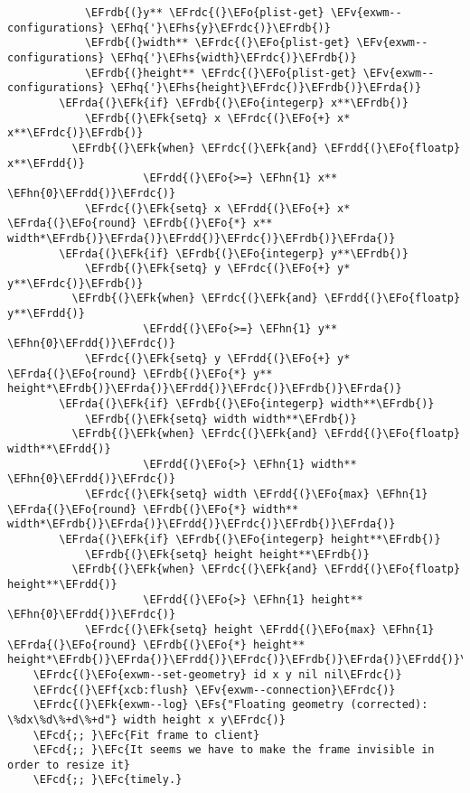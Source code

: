 \documentclass[a4wide,10pt]{article}
\newcommand{\EFc}[1]{\textcolor{EFc}{#1}} %
\newcommand{\EFcd}[1]{\textcolor{EFcd}{#1}} %
\newcommand{\EFs}[1]{\textcolor{EFs}{#1}} %
\newcommand{\EFk}[1]{\textcolor{EFk}{#1}} %
\newcommand{\EFf}[1]{\textcolor{EFf}{#1}} %
\newcommand{\EFv}[1]{\textcolor{EFv}{#1}} %
\newcommand{\EFo}[1]{\textcolor{EFo}{#1}} %
\newcommand{\EFhn}[1]{\textcolor{EFhn}{\textbf{#1}}} %
\newcommand{\EFhq}[1]{\textcolor{EFhq}{#1}} %
\newcommand{\EFhs}[1]{\textcolor{EFhs}{#1}} %
\newcommand{\EFrda}[1]{\textcolor{EFrda}{#1}} %
\newcommand{\EFrdb}[1]{\textcolor{EFrdb}{#1}} %
\newcommand{\EFrdc}[1]{\textcolor{EFrdc}{#1}} %
\newcommand{\EFrdd}[1]{\textcolor{EFrdd}{#1}} %
\begin{document}
\begin{Code}
\begin{Verbatim}
            \EFrdb{(}y** \EFrdc{(}\EFo{plist-get} \EFv{exwm--configurations} \EFhq{'}\EFhs{y}\EFrdc{)}\EFrdb{)}
            \EFrdb{(}width** \EFrdc{(}\EFo{plist-get} \EFv{exwm--configurations} \EFhq{'}\EFhs{width}\EFrdc{)}\EFrdb{)}
            \EFrdb{(}height** \EFrdc{(}\EFo{plist-get} \EFv{exwm--configurations} \EFhq{'}\EFhs{height}\EFrdc{)}\EFrdb{)}\EFrda{)}
        \EFrda{(}\EFk{if} \EFrdb{(}\EFo{integerp} x**\EFrdb{)}
            \EFrdb{(}\EFk{setq} x \EFrdc{(}\EFo{+} x* x**\EFrdc{)}\EFrdb{)}
          \EFrdb{(}\EFk{when} \EFrdc{(}\EFk{and} \EFrdd{(}\EFo{floatp} x**\EFrdd{)}
                     \EFrdd{(}\EFo{>=} \EFhn{1} x** \EFhn{0}\EFrdd{)}\EFrdc{)}
            \EFrdc{(}\EFk{setq} x \EFrdd{(}\EFo{+} x* \EFrda{(}\EFo{round} \EFrdb{(}\EFo{*} x** width*\EFrdb{)}\EFrda{)}\EFrdd{)}\EFrdc{)}\EFrdb{)}\EFrda{)}
        \EFrda{(}\EFk{if} \EFrdb{(}\EFo{integerp} y**\EFrdb{)}
            \EFrdb{(}\EFk{setq} y \EFrdc{(}\EFo{+} y* y**\EFrdc{)}\EFrdb{)}
          \EFrdb{(}\EFk{when} \EFrdc{(}\EFk{and} \EFrdd{(}\EFo{floatp} y**\EFrdd{)}
                     \EFrdd{(}\EFo{>=} \EFhn{1} y** \EFhn{0}\EFrdd{)}\EFrdc{)}
            \EFrdc{(}\EFk{setq} y \EFrdd{(}\EFo{+} y* \EFrda{(}\EFo{round} \EFrdb{(}\EFo{*} y** height*\EFrdb{)}\EFrda{)}\EFrdd{)}\EFrdc{)}\EFrdb{)}\EFrda{)}
        \EFrda{(}\EFk{if} \EFrdb{(}\EFo{integerp} width**\EFrdb{)}
            \EFrdb{(}\EFk{setq} width width**\EFrdb{)}
          \EFrdb{(}\EFk{when} \EFrdc{(}\EFk{and} \EFrdd{(}\EFo{floatp} width**\EFrdd{)}
                     \EFrdd{(}\EFo{>} \EFhn{1} width** \EFhn{0}\EFrdd{)}\EFrdc{)}
            \EFrdc{(}\EFk{setq} width \EFrdd{(}\EFo{max} \EFhn{1} \EFrda{(}\EFo{round} \EFrdb{(}\EFo{*} width** width*\EFrdb{)}\EFrda{)}\EFrdd{)}\EFrdc{)}\EFrdb{)}\EFrda{)}
        \EFrda{(}\EFk{if} \EFrdb{(}\EFo{integerp} height**\EFrdb{)}
            \EFrdb{(}\EFk{setq} height height**\EFrdb{)}
          \EFrdb{(}\EFk{when} \EFrdc{(}\EFk{and} \EFrdd{(}\EFo{floatp} height**\EFrdd{)}
                     \EFrdd{(}\EFo{>} \EFhn{1} height** \EFhn{0}\EFrdd{)}\EFrdc{)}
            \EFrdc{(}\EFk{setq} height \EFrdd{(}\EFo{max} \EFhn{1} \EFrda{(}\EFo{round} \EFrdb{(}\EFo{*} height** height*\EFrdb{)}\EFrda{)}\EFrdd{)}\EFrdc{)}\EFrdb{)}\EFrda{)}\EFrdd{)}\EFrdc{)}
    \EFrdc{(}\EFo{exwm--set-geometry} id x y nil nil\EFrdc{)}
    \EFrdc{(}\EFf{xcb:flush} \EFv{exwm--connection}\EFrdc{)}
    \EFrdc{(}\EFk{exwm--log} \EFs{"Floating geometry (corrected): \%dx\%d\%+d\%+d"} width height x y\EFrdc{)}
    \EFcd{;; }\EFc{Fit frame to client}
    \EFcd{;; }\EFc{It seems we have to make the frame invisible in order to resize it}
    \EFcd{;; }\EFc{timely.}

\end{Verbatim}
\end{Code}
\end{document}

